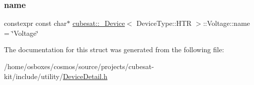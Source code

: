 \subsubsection{\texorpdfstring{name}{name}}
{\footnotesize\ttfamily constexpr const char$\ast$ \hyperlink{structcubesat_1_1__Device}{cubesat\+::\+\_\+\+Device}$<$ Device\+Type\+::\+H\+TR $>$\+::Voltage\+::name = \char`\"{}Voltage\char`\"{}\hspace{0.3cm}{\ttfamily [static]}}



The documentation for this struct was generated from the following file\+:\begin{DoxyCompactItemize}
\item 
/home/osboxes/cosmos/source/projects/cubesat-\/kit/include/utility/\hyperlink{DeviceDetail_8h}{Device\+Detail.\+h}\end{DoxyCompactItemize}

